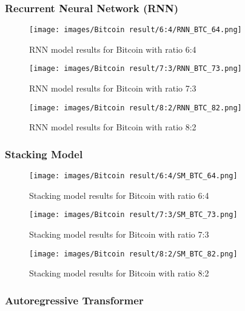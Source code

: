 \documentclass{ieeeojies}
\begin{document}
\subsubsection{Recurrent Neural Network (RNN)}

\begin{figure}[H]
  \centering
  \texttt{[image: images/Bitcoin result/6:4/RNN\_BTC\_64.png]}
  \caption{RNN model results for Bitcoin with ratio 6:4}
  \label{fig:rnn_btc_64}
\end{figure}

\begin{figure}[H]
  \centering
  \texttt{[image: images/Bitcoin result/7:3/RNN\_BTC\_73.png]}
  \caption{RNN model results for Bitcoin with ratio 7:3}
  \label{fig:rnn_btc_73}
\end{figure}

\begin{figure}[H]
  \centering
  \texttt{[image: images/Bitcoin result/8:2/RNN\_BTC\_82.png]}
  \caption{RNN model results for Bitcoin with ratio 8:2}
  \label{fig:rnn_btc_82}
\end{figure}

\subsubsection{Stacking Model}

\begin{figure}[H]
  \centering
  \texttt{[image: images/Bitcoin result/6:4/SM\_BTC\_64.png]}
  \caption{Stacking model results for Bitcoin with ratio 6:4}
  \label{fig:sm_btc_64}
\end{figure}

\begin{figure}[H]
  \centering
  \texttt{[image: images/Bitcoin result/7:3/SM\_BTC\_73.png]}
  \caption{Stacking model results for Bitcoin with ratio 7:3}
  \label{fig:sm_btc_73}
\end{figure}

\begin{figure}[H]
  \centering
  \texttt{[image: images/Bitcoin result/8:2/SM\_BTC\_82.png]}
  \caption{Stacking model results for Bitcoin with ratio 8:2}
  \label{fig:sm_btc_82}
\end{figure}

\subsubsection{Autoregressive Transformer}
\end{document}
